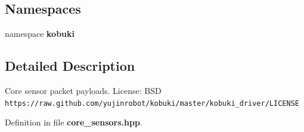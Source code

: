 \subsection*{\-Namespaces}
\begin{DoxyCompactItemize}
\item 
namespace {\bf kobuki}
\end{DoxyCompactItemize}


\subsection{\-Detailed \-Description}
\-Core sensor packet payloads. \-License\-: \-B\-S\-D {\tt https\-://raw.\-github.\-com/yujinrobot/kobuki/master/kobuki\-\_\-driver/\-L\-I\-C\-E\-N\-S\-E} 

\-Definition in file {\bf core\-\_\-sensors.\-hpp}.

